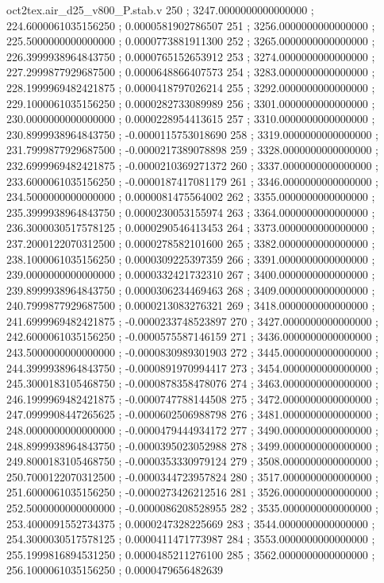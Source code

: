 \begin{filecontents}[overwrite]{oct2tex.air_d25_v800_P.stab.v}
250 ; 3247.0000000000000000 ; 224.6000061035156250 ; 0.0000581902786507
251 ; 3256.0000000000000000 ; 225.5000000000000000 ; 0.0000773881911300
252 ; 3265.0000000000000000 ; 226.3999938964843750 ; 0.0000765152653912
253 ; 3274.0000000000000000 ; 227.2999877929687500 ; 0.0000648866407573
254 ; 3283.0000000000000000 ; 228.1999969482421875 ; 0.0000418797026214
255 ; 3292.0000000000000000 ; 229.1000061035156250 ; 0.0000282733089989
256 ; 3301.0000000000000000 ; 230.0000000000000000 ; 0.0000228954413615
257 ; 3310.0000000000000000 ; 230.8999938964843750 ; -0.0000115753018690
258 ; 3319.0000000000000000 ; 231.7999877929687500 ; -0.0000217389078898
259 ; 3328.0000000000000000 ; 232.6999969482421875 ; -0.0000210369271372
260 ; 3337.0000000000000000 ; 233.6000061035156250 ; -0.0000187417081179
261 ; 3346.0000000000000000 ; 234.5000000000000000 ; 0.0000081475564002
262 ; 3355.0000000000000000 ; 235.3999938964843750 ; 0.0000230053155974
263 ; 3364.0000000000000000 ; 236.3000030517578125 ; 0.0000290546413453
264 ; 3373.0000000000000000 ; 237.2000122070312500 ; 0.0000278582101600
265 ; 3382.0000000000000000 ; 238.1000061035156250 ; 0.0000309225397359
266 ; 3391.0000000000000000 ; 239.0000000000000000 ; 0.0000332421732310
267 ; 3400.0000000000000000 ; 239.8999938964843750 ; 0.0000306234469463
268 ; 3409.0000000000000000 ; 240.7999877929687500 ; 0.0000213083276321
269 ; 3418.0000000000000000 ; 241.6999969482421875 ; -0.0000233748523897
270 ; 3427.0000000000000000 ; 242.6000061035156250 ; -0.0000575587146159
271 ; 3436.0000000000000000 ; 243.5000000000000000 ; -0.0000830989301903
272 ; 3445.0000000000000000 ; 244.3999938964843750 ; -0.0000891970994417
273 ; 3454.0000000000000000 ; 245.3000183105468750 ; -0.0000878358478076
274 ; 3463.0000000000000000 ; 246.1999969482421875 ; -0.0000747788144508
275 ; 3472.0000000000000000 ; 247.0999908447265625 ; -0.0000602506988798
276 ; 3481.0000000000000000 ; 248.0000000000000000 ; -0.0000479444934172
277 ; 3490.0000000000000000 ; 248.8999938964843750 ; -0.0000395023052988
278 ; 3499.0000000000000000 ; 249.8000183105468750 ; -0.0000353330979124
279 ; 3508.0000000000000000 ; 250.7000122070312500 ; -0.0000344723957824
280 ; 3517.0000000000000000 ; 251.6000061035156250 ; -0.0000273426212516
281 ; 3526.0000000000000000 ; 252.5000000000000000 ; -0.0000086208528955
282 ; 3535.0000000000000000 ; 253.4000091552734375 ; 0.0000247328225669
283 ; 3544.0000000000000000 ; 254.3000030517578125 ; 0.0000411471773987
284 ; 3553.0000000000000000 ; 255.1999816894531250 ; 0.0000485211276100
285 ; 3562.0000000000000000 ; 256.1000061035156250 ; 0.0000479656482639

\end{filecontents}
